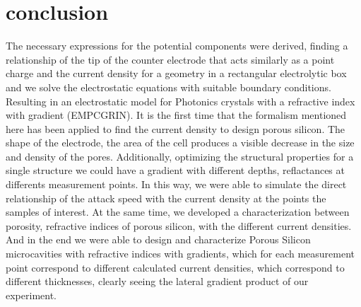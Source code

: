 \documentclass{article}
\begin{document}
\section{conclusion}
\label{sec:conclusion}
The necessary expressions for the potential components were derived,
finding a relationship of the tip of the counter electrode that acts
similarly as a point charge and the current density for a geometry in
a rectangular electrolytic box and we solve the electrostatic
equations with suitable boundary conditions. Resulting in an
electrostatic model for  Photonics crystals with a refractive index
with gradient (EMPCGRIN).
It is the first time that the formalism mentioned here has been
applied to find the current density to design porous silicon. The
shape of the electrode, the area of the cell produces a visible
decrease in the size and density of the pores. Additionally,
optimizing the structural properties for a single structure we could
have a gradient with different depths, reflactances at differents
measurement points. In this way, we were able to simulate the direct
relationship of the attack speed with the current density at the
points  the samples of interest. At the same time, we developed a
characterization between porosity, refractive indices of porous
silicon, with the different current densities. And in the end we were
able to design and characterize Porous Silicon microcavities with
refractive indices with gradients, which for each measurement point
correspond to different calculated current densities, which correspond
to different thicknesses, clearly seeing the lateral gradient product
of our experiment.
\end{document}
